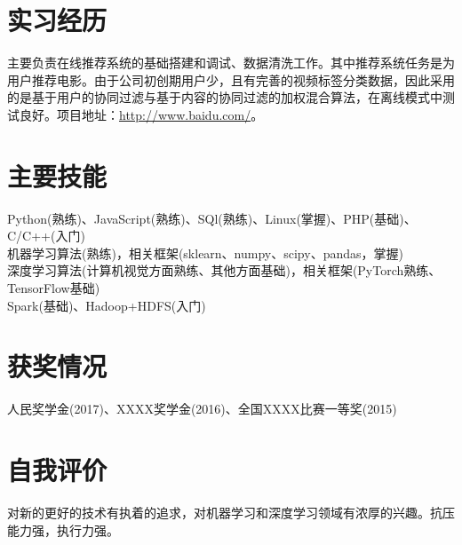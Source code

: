 \documentclass{resume}
\begin{document}
\section{实习经历}
\begin{onehalfspacing}
\normalsize{主要负责在线推荐系统的基础搭建和调试、数据清洗工作。其中推荐系统任务是为用户推荐电影。由于公司初创期用户少，且有完善的视频标签分类数据，因此采用的是基于用户的协同过滤与基于内容的协同过滤的加权混合算法，在离线模式中测试良好。项目地址：\href{http://www.baidu.com/}{http://www.baidu.com/}。}
\end{onehalfspacing}

\section{主要技能}
Python(熟练)、JavaScript(熟练)、SQl(熟练)、Linux(掌握)、PHP(基础)、C/C++(入门)\\
机器学习算法(熟练)，相关框架(sklearn、numpy、scipy、pandas，掌握)\\
深度学习算法(计算机视觉方面熟练、其他方面基础)，相关框架(PyTorch熟练、TensorFlow基础)\\
Spark(基础)、Hadoop+HDFS(入门)

\section{获奖情况}
人民奖学金(2017)、XXXX奖学金(2016)、全国XXXX比赛一等奖(2015)

\section{自我评价}
对新的更好的技术有执着的追求，对机器学习和深度学习领域有浓厚的兴趣。抗压能力强，执行力强。
\end{document}
